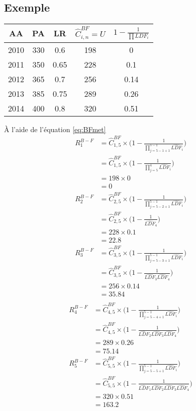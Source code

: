 \subsection*{Exemple}

\begin{center}

\begin{tabular}{|c|c|c|c|c|}
  \hline
   AA & PA & LR & $\widehat{C}_{i,n}^{BF} = U$ & $1 - \frac{1}{\prod LDF_i}$  \\
  \hline
  2010 & 330 & 0.6 & 198 & 0 \\
  2011 & 350 & 0.65 & 228 & 0.1 \\
  2012 & 365 & 0.7 & 256 & 0.14 \\
  2013 & 385 & 0.75 & 289 & 0.26 \\
  2014 & 400 & 0.8 & 320 & 0.51 \\
  \hline
\end{tabular}
\end{center}
À l'aide de l'équation \ref{eq:BFmet}
\begin{align*}
R_1^{B-F} &= \widehat{C}_{1,5}^{BF} \times \Bigg( 1 - \frac{1}{\prod_{j = 5 - 1 + 1}^{5 - 1} \widehat{LDF}_i}\Bigg)  \\
&= \widehat{C}_{1,5}^{BF} \times \Bigg( 1 - \frac{1}{\prod_{j = 5 }^{4} \widehat{LDF}_i}\Bigg)  \\
&= 198 \times 0 \\
&= 0 \\
R_2^{B-F} &= \widehat{C}_{2,5}^{BF} \times \Bigg( 1 - \frac{1}{\prod_{j = 5 - 2 + 1}^{5 - 1} \widehat{LDF}_i}\Bigg)  \\
&= \widehat{C}_{2,5}^{BF} \times \Bigg( 1 - \frac{1}{\widehat{LDF}_4}\Bigg)  \\
&= 228 \times 0.1 \\
&= 22.8 \\
R_3^{B-F} &= \widehat{C}_{3,5}^{BF} \times \Bigg( 1 - \frac{1}{\prod_{j = 5 - 3 + 1}^{5 - 1} \widehat{LDF}_i}\Bigg)  \\
&= \widehat{C}_{3,5}^{BF} \times \Bigg( 1 - \frac{1}{\widehat{LDF}_3\widehat{LDF}_4}\Bigg)  \\
&= 256 \times 0.14 \\
&= 35.84 \\
\end{align*}
\begin{align*}
R_4^{B-F} &= \widehat{C}_{4,5}^{BF} \times \Bigg( 1 - \frac{1}{\prod_{j = 5 - 4 + 1}^{5 - 1} \widehat{LDF}_i}\Bigg)  \\
&= \widehat{C}_{4,5}^{BF} \times \Bigg( 1 - \frac{1}{\widehat{LDF}_2\widehat{LDF}_3\widehat{LDF}_4}\Bigg)  \\
&= 289 \times 0.26 \\
&= 75.14 \\
R_5^{B-F} &= \widehat{C}_{5,5}^{BF} \times \Bigg( 1 - \frac{1}{\prod_{j = 5 - 5 + 1}^{5 - 1} \widehat{LDF}_i}\Bigg)  \\
&= \widehat{C}_{5,5}^{BF} \times \Bigg( 1 - \frac{1}{\widehat{LDF}_1\widehat{LDF}_2\widehat{LDF}_3\widehat{LDF}_4}\Bigg)  \\
&= 320 \times 0.51 \\
&= 163.2 \\
\end{align*}

